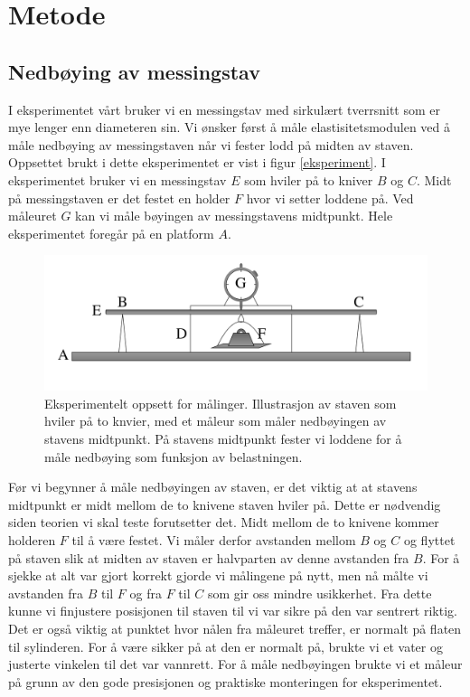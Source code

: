 \documentclass[%
 reprint,
 amsmath,amssymb,
 aps,
 norsk,
 booktabs
]{revtex4-1}
\begin{document}
\section{Metode}
\subsection{Nedbøying av messingstav}
I eksperimentet vårt bruker vi en messingstav med sirkulært tverrsnitt som er mye lenger enn diameteren sin. Vi ønsker først å måle elastisitetsmodulen ved å måle nedbøying av messingstaven når vi fester lodd på midten av staven. Oppsettet brukt i dette eksperimentet er vist i figur \vref{eksperiment}. I eksperimentet bruker vi en messingstav $E$ som hviler på to kniver $B$ og $C$. Midt på messingstaven er det festet en holder $F$ hvor vi setter loddene på. Ved måleuret $G$ kan vi måle bøyingen av messingstavens midtpunkt. Hele eksperimentet foregår på en platform $A$.\\
\begin{figure}
  \centering
  \includegraphics[scale=0.17]{oppsett.png}
  \caption{Eksperimentelt oppsett for målinger. Illustrasjon av staven som hviler på to knvier, med et måleur som måler nedbøyingen av stavens midtpunkt. På stavens midtpunkt fester vi loddene for å måle nedbøying som funksjon av belastningen.}
  \label{eksperiment}
\end{figure}
Før vi begynner å måle nedbøyingen av staven, er det viktig at at stavens midtpunkt er midt mellom de to knivene staven hviler på. Dette er nødvendig siden teorien vi skal teste forutsetter det. Midt mellom de to knivene kommer holderen $F$ til å være festet. Vi måler derfor avstanden mellom $B$ og $C$ og flyttet på staven slik at midten av staven er halvparten av denne avstanden fra $B$. For å sjekke at alt var gjort korrekt gjorde vi målingene på nytt, men nå målte vi avstanden fra $B$ til $F$ og fra $F$ til $C$ som gir oss mindre usikkerhet. Fra dette kunne vi finjustere posisjonen til staven til vi var sikre på den var sentrert riktig. Det er også viktig at punktet hvor nålen fra måleuret treffer, er normalt på flaten til sylinderen. For å være sikker på at den er normalt på, brukte vi et vater og justerte vinkelen til det var vannrett. For å måle nedbøyingen brukte vi et måleur på grunn av den gode presisjonen og praktiske monteringen for eksperimentet.\\
\end{document}
